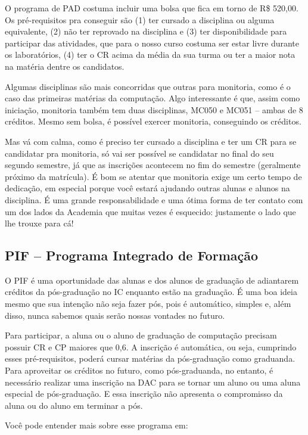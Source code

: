 O programa de PAD costuma incluir uma bolsa que fica em torno de R\$ 520,00.
Os pré-requisitos pra conseguir são (1) ter cursado a disciplina ou alguma
equivalente, (2) não ter reprovado na disciplina e (3) ter disponibilidade para
participar das atividades, que para o nosso curso costuma ser estar livre
durante os laboratórios, (4) ter o CR acima da média da sua turma ou ter a
maior nota na matéria dentre os candidatos.

Algumas disciplinas são mais concorridas que outras para monitoria, como é o
caso das primeiras matérias da computação. Algo interessante é que, assim como
iniciação, monitoria também tem duas disciplinas, MC050 e MC051 -- ambas de 8
créditos. Mesmo sem bolsa, é possível exercer monitoria, conseguindo os
créditos.

Mas vá com calma, como é preciso ter cursado a disciplina e ter um CR para se
candidatar pra monitoria, só vai ser possível se candidatar no final do seu
segundo semestre, já que as inscrições acontecem no fim do semestre (geralmente
próximo da matrícula). É bom se atentar que monitoria exige um certo tempo de
dedicação, em especial porque você estará ajudando outras alunas e alunos na
disciplina. É uma grande responsabilidade e uma ótima forma de ter contato com
um dos lados da Academia que muitas vezes é esquecido: justamente o lado que
lhe trouxe para cá!

\subsection{PIF -- Programa Integrado de Formação}

O PIF é uma oportunidade das alunas e dos alunos de graduação de adiantarem
créditos da pós-graduação no IC enquanto estão na graduação. É uma boa ideia
mesmo que sua intenção não seja fazer pós, pois é automático, simples e, além
disso, nunca sabemos quais serão nossas vontades no futuro.

Para participar, a aluna ou o aluno de graduação de computação precisam possuir
CR e CP maiores que 0,6. A inscrição é automática, ou seja, cumprindo esses
pré-requisitos, poderá cursar maté\-rias da pós-graduação como graduanda. Para
apro\-veitar os créditos no futuro, como pós-graduanda, no entanto, é necessário
realizar uma inscrição na DAC para se tornar um aluno ou uma aluna especial de
pós-graduação. E essa inscrição não apresenta o compromisso da aluna ou do
aluno em terminar a pós.

Você pode entender mais sobre esse programa em:

